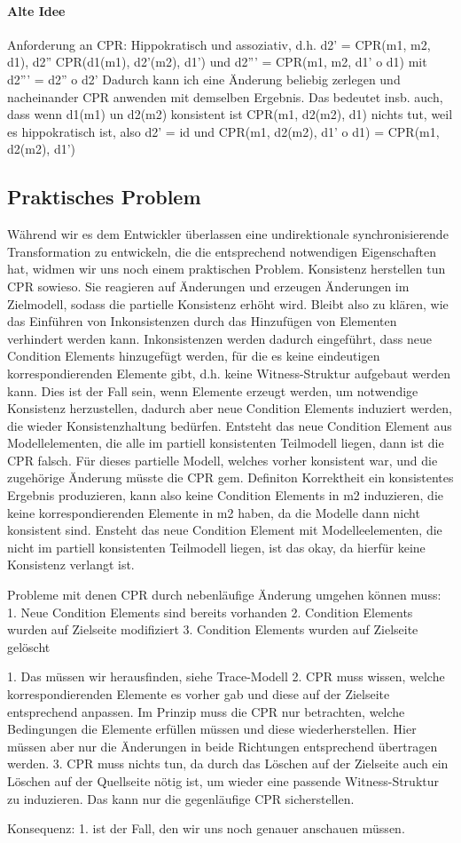 \paragraph{Alte Idee}
Anforderung an CPR:
Hippokratisch und assoziativ, d.h.
d2' = CPR(m1, m2, d1), d2'' CPR(d1(m1), d2'(m2), d1')
und d2''' = CPR(m1, m2, d1' o d1) mit d2''' = d2'' o d2'
Dadurch kann ich eine Änderung beliebig zerlegen und nacheinander CPR anwenden mit demselben Ergebnis.
Das bedeutet insb. auch, dass wenn d1(m1) un d2(m2) konsistent ist CPR(m1, d2(m2), d1) nichts tut, weil es hippokratisch ist, also d2' = id und CPR(m1, d2(m2), d1' o d1) = CPR(m1, d2(m2), d1')


\subsection{Praktisches Problem}
Während wir es dem Entwickler überlassen eine undirektionale synchronisierende Transformation zu entwickeln, die die entsprechend notwendigen Eigenschaften hat, widmen wir uns noch einem praktischen Problem.
Konsistenz herstellen tun CPR sowieso. Sie reagieren auf Änderungen und erzeugen Änderungen im Zielmodell, sodass die partielle Konsistenz erhöht wird.
Bleibt also zu klären, wie das Einführen von Inkonsistenzen durch das Hinzufügen von Elementen verhindert werden kann.
Inkonsistenzen werden dadurch eingeführt, dass neue Condition Elements hinzugefügt werden, für die es keine eindeutigen korrespondierenden Elemente gibt, d.h. keine Witness-Struktur aufgebaut werden kann.
Dies ist der Fall sein, wenn Elemente erzeugt werden, um notwendige Konsistenz herzustellen, dadurch aber neue Condition Elements induziert werden, die wieder Konsistenzhaltung bedürfen.
Entsteht das neue Condition Element aus Modellelementen, die alle im partiell konsistenten Teilmodell liegen, dann ist die CPR falsch.
Für dieses partielle Modell, welches vorher konsistent war, und die zugehörige Änderung müsste die CPR gem. Definiton Korrektheit ein konsistentes Ergebnis produzieren, kann also keine Condition Elements in m2 induzieren, die keine korrespondierenden Elemente in m2 haben, da die Modelle dann nicht konsistent sind.
Ensteht das neue Condition Element mit Modelleelementen, die nicht im partiell konsistenten Teilmodell liegen, ist das okay, da hierfür keine Konsistenz verlangt ist.

Probleme mit denen CPR durch nebenläufige Änderung umgehen können muss:
1. Neue Condition Elements sind bereits vorhanden
2. Condition Elements wurden auf Zielseite modifiziert
3. Condition Elements wurden auf Zielseite gelöscht

1. Das müssen wir herausfinden, siehe Trace-Modell
2. CPR muss wissen, welche korrespondierenden Elemente es vorher gab und diese auf der Zielseite entsprechend anpassen. Im Prinzip muss die CPR nur betrachten, welche Bedingungen die Elemente erfüllen müssen und diese wiederherstellen. Hier müssen aber nur die Änderungen in beide Richtungen entsprechend übertragen werden.
3. CPR muss nichts tun, da durch das Löschen auf der Zielseite auch ein Löschen auf der Quellseite nötig ist, um wieder eine passende Witness-Struktur zu induzieren. Das kann nur die gegenläufige CPR sicherstellen.

Konsequenz: 1. ist der Fall, den wir uns noch genauer anschauen müssen.